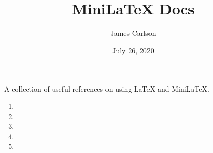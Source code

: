 \title{MiniLaTeX Docs}
\author{James Carlson}
\date{July 26, 2020}

\maketitle


A collection of useful references on using LaTeX and MiniLaTeX.

\begin{enumerate}

\item {}

\item {}

\item {}

\item {}


\item {}

\end{enumerate}
